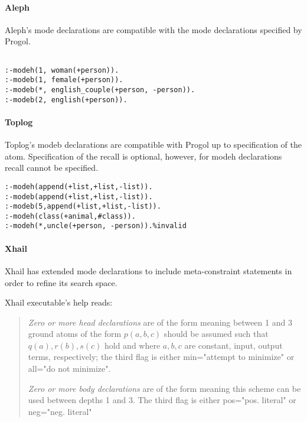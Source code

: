 \paragraph{Aleph}
Aleph's mode declarations are compatible\cite{aleph2007} with the mode declarations specified by Progol.
\begin{exmp}
\begin{lstlisting}

:-modeh(1, woman(+person)).
:-modeb(1, female(+person)).
:-modeb(*, english_couple(+person, -person)).
:-modeb(2, english(+person)).
\end{lstlisting}
\end{exmp}

\paragraph{Toplog}
Toplog's modeb declarations are compatible with Progol up to specification of the atom. Specification of the recall is optional, however, for modeh declarations recall cannot be specified\cite{santos2008toplogWebsite}.
\begin{exmp}\cite{santos2008toplogWebsite}
\begin{lstlisting}
:-modeh(append(+list,+list,-list)).
:-modeb(append(+list,+list,-list)).
:-modeb(5,append(+list,+list,-list)).
:-modeh(class(+animal,#class)).
:-modeh(*,uncle(+person, -person)).%invalid
\end{lstlisting}
\end{exmp}

\paragraph{Xhail}\label{xhail_mode_declarations}
Xhail has extended mode declarations to include meta-constraint statements in order to refine its search space.

Xhail executable's help\cite{ray2007xhail} reads:
\begin{quote}
\emph{Zero or more head declarations} are of the form
 meaning between 1 and 3 ground atoms
 of the form $p(a,b,c)$ should be assumed such that $q(a), r(b), s(c)$ hold 
 and where $a, b, c$ are constant, input, output terms, respectively;
 the third flag is either min="attempt to minimize" or all="do not minimize".
 
\emph{Zero or more body declarations} are of the form  meaning this scheme can be used between 
 depths 1 and 3.  The third flag is either pos="pos. literal" or neg="neg. literal" 
\end{quote}

